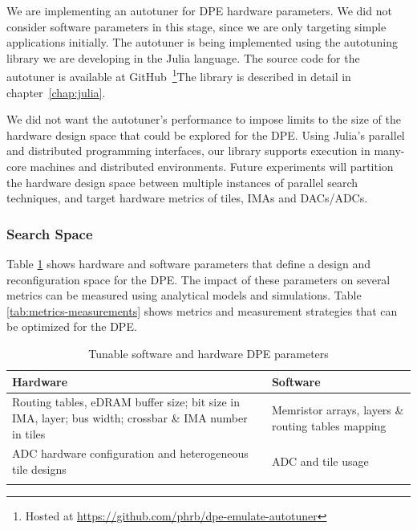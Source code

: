 We are implementing an autotuner for DPE hardware parameters.  We did not
consider software parameters in this stage, since we are only targeting simple
applications initially. The autotuner is being implemented using the autotuning
library we are developing in the Julia language. The source code for the
autotuner is available at GitHub~\footnote{Hosted at
\url{https://github.com/phrb/dpe-emulate-autotuner}}The library is described in
detail in chapter~\ref{chap:julia}.

We did not want the autotuner's performance to impose limits to the size of the
hardware design space that could be explored for the DPE. Using Julia's
parallel and distributed programming interfaces, our library supports execution
in many-core machines and distributed environments. Future experiments will
partition the hardware design space between multiple instances of parallel
search techniques, and target hardware metrics of tiles, IMAs and DACs/ADCs.

\subsubsection{Search Space}

Table \ref{tab:hard-soft-params} shows hardware and software parameters that
define a design and reconfiguration space for the DPE. The impact of these
parameters on several metrics can be measured using analytical models and
simulations.  Table \ref{tab:metrics-measurements} shows metrics and
measurement strategies that can be optimized for the DPE.

\begin{table}[htpb]
\centering
\begin{tabular}{@{}p{}p{}@{}}
\toprule
\textbf{Hardware} & \textbf{Software} \\ \midrule
Routing tables, eDRAM buffer size; bit size in IMA, layer; bus width; crossbar \& IMA number in tiles & Memristor arrays, layers \& routing tables mapping  \\
\addlinespace
ADC hardware configuration and heterogeneous tile designs & ADC and tile usage \\ \bottomrule
\addlinespace
\end{tabular}
\caption{Tunable software and hardware DPE parameters
}
\label{tab:hard-soft-params}
\end{table}

